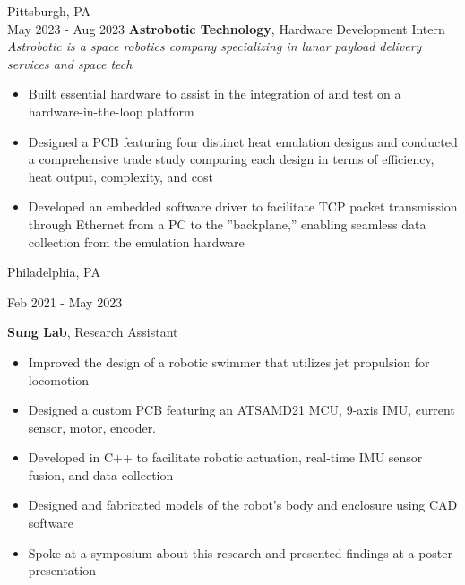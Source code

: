     \begin{twocolentry}{
        Pittsburgh, PA \\
        May 2023 - Aug 2023}
        \textbf{Astrobotic Technology}, Hardware Development Intern \\
        \textit{Astrobotic is a space robotics company specializing in lunar payload delivery services and space tech}
        \begin{itemize}[nosep, after=\strut, leftmargin=1em, itemsep=2pt]
            \item Built essential hardware to assist in the integration of and test on a hardware-in-the-loop platform
            \item Designed a PCB featuring four distinct heat emulation designs and conducted a comprehensive trade study comparing each design in terms of efficiency, heat output, complexity, and cost
            \item Developed an embedded software driver to facilitate TCP packet transmission through Ethernet from a PC to the ”backplane,” enabling seamless data collection from the emulation hardware
            \end{itemize}
    \end{twocolentry}

    \begin{twocolentry}{
        Philadelphia, PA
        
        Feb 2021 - May 2023}
        \textbf{Sung Lab}, Research Assistant
        \begin{itemize}[nosep,after=\strut, leftmargin=1em, itemsep=2pt]
        \item Improved the design of a robotic swimmer that utilizes jet propulsion for locomotion
        \item Designed a custom PCB featuring an ATSAMD21 MCU, 9-axis IMU, current sensor, motor, encoder.
        \item Developed in C++ to facilitate robotic actuation, real-time IMU sensor fusion, and data collection
        \item Designed and fabricated models of the robot’s body and enclosure using CAD software
        \item Spoke at a symposium about this research and presented findings at a poster presentation
            \end{itemize}
    \end{twocolentry}